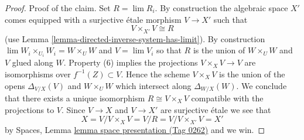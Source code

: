 \documentclass{amsart}
\theoremstyle{plain}
\theoremstyle{definition}
\theoremstyle{remark}
\numberwithin{equation}{subsection}
\def\lim{\mathop{\mathrm{lim}}\nolimits}
\begin{document}
\begin{proof}
\medskip\noindent
Proof of the claim. Set $R = \lim R_i$.
By construction the algebraic space $X'$ comes
equipped with a surjective \'etale morphism $V \to X'$ such that
$$
V \times_{X'} V \cong R
$$
(use Lemma \ref{lemma-directed-inverse-system-has-limit}).
By construction $\lim W_i \times_{U_i} W_i = W \times_U W$ and $V = \lim V_i$
so that $R$ is the union of $W \times_U W$ and $V$ glued along $W$.
Property (6) implies the projections $V \times_X V \to V$ are isomorphisms
over $f^{-1}(Z) \subset V$. Hence the scheme $V \times_X V$ is the union
of the opens $\Delta_{V/X}(V)$ and $W \times_U W$ which intersect
along $\Delta_{W/X}(W)$. We conclude that there exists a unique isomorphism
$R \cong V \times_X V$ compatible with the projections to $V$.
Since $V \to X$ and $V \to X'$ are surjective \'etale we see that
$$
X = V/ V \times_X V = V/R = V/V \times_{X'} V = X'
$$
by Spaces, Lemma \href{https://stacks.math.columbia.edu/tag/0262}{lemma space presentation (Tag 0262)} and we win.
\end{proof}
\end{document}
